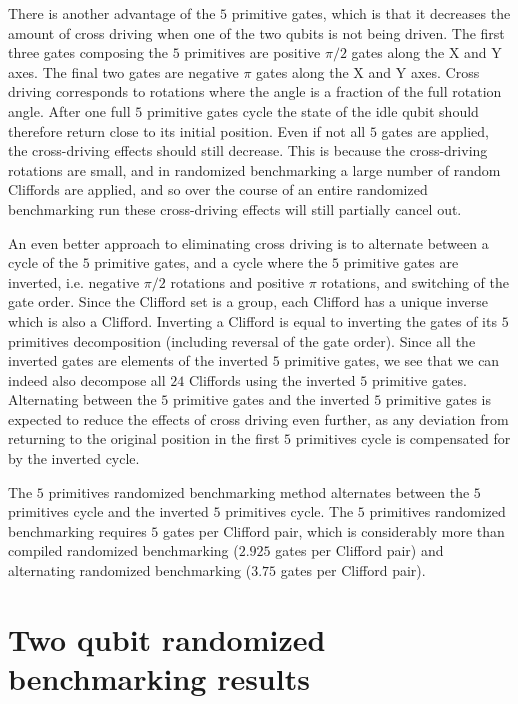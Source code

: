         There is another advantage of the $5$ primitive gates, which is that it decreases the amount of cross driving when one of the two qubits is not being driven. The first three gates composing the $5$ primitives are positive $\pi/2$ gates along the X and Y axes. The final two gates are negative $\pi$ gates along the X and Y axes. Cross driving corresponds to rotations where the angle is a fraction of the full rotation angle. After one full $5$ primitive gates cycle the state of the idle qubit should therefore return close to its initial position. Even if not all $5$ gates are applied, the cross-driving effects should still decrease. This is because the cross-driving rotations are small, and in randomized benchmarking a large number of random Cliffords are applied, and so over the course of an entire randomized benchmarking run these cross-driving effects will still partially cancel out.

        An even better approach to eliminating cross driving is to alternate between a cycle of the $5$ primitive gates, and a cycle where the $5$ primitive gates are inverted, i.e. negative $\pi/2$ rotations and positive $\pi$ rotations, and switching of the gate order. Since the Clifford set is a group, each Clifford has a unique inverse which is also a Clifford. Inverting a Clifford is equal to inverting the gates of its $5$ primitives decomposition (including reversal of the gate order). Since all the inverted gates are elements of the inverted $5$ primitive gates, we see that we can indeed also decompose all $24$ Cliffords using the inverted $5$ primitive gates. Alternating between the $5$ primitive gates and the inverted $5$ primitive gates is expected to reduce the effects of cross driving even further, as any deviation from returning to the original position in the first $5$ primitives cycle is compensated for by the inverted cycle.

        The $5$ primitives randomized benchmarking method alternates between the $5$ primitives cycle and the inverted $5$ primitives cycle. The $5$ primitives randomized benchmarking requires $5$ gates per Clifford pair, which is considerably more than compiled randomized benchmarking ($2.925$ gates per Clifford pair) and alternating randomized benchmarking ($3.75$ gates per Clifford pair).

        \section{Two qubit randomized benchmarking results}
          \label{Two qubit randomized benchmarking results}

